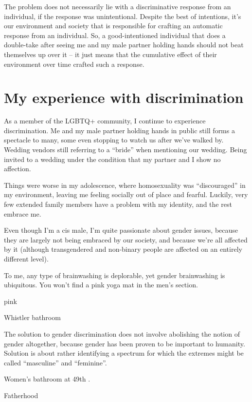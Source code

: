 \documentclass[]{book}
\begin{document}
The problem does not necessarily lie with a discriminative response from an individual, if the response was unintentional. Despite the best of intentions, it's our environment and society that is responsible for crafting an automatic response from an individual. So, a good-intentioned individual that does a double-take after seeing me and my male partner holding hands should not beat themselves up over it -- it just means that the cumulative effect of their environment over time crafted such a response.

\hypertarget{my-experience-with-discrimination}{%
\section{My experience with discrimination}\label{my-experience-with-discrimination}}

As a member of the LGBTQ+ community, I continue to experience discrimination. Me and my male partner holding hands in public still forms a spectacle to many, some even stopping to watch us after we've walked by. Wedding vendors still referring to a ``bride'' when mentioning our wedding. Being invited to a wedding under the condition that my partner and I show no affection.

Things were worse in my adolescence, where homosexuality was ``discouraged'' in my environment, leaving me feeling socially out of place and fearful. Luckily, very few extended family members have a problem with my identity, and the rest embrace me.

Even though I'm a cis male, I'm quite passionate about gender issues, because they are largely not being embraced by our society, and because we're all affected by it (although transgendered and non-binary people are affected on an entirely different level).

To me, any type of brainwashing is deplorable, yet gender brainwashing is ubiquitous. You won't find a pink yoga mat in the men's section.

pink

Whistler bathroom

The solution to gender discrimination does not involve abolishing the notion of gender altogether, because gender has been proven to be important to humanity. Solution is about rather identifying a spectrum for which the extremes might be called ``masculine'' and ``feminine''.

Women's bathroom at 49th \textbar\textbar.

Fatherhood
\end{document}
